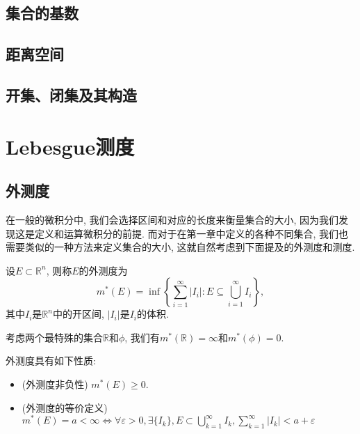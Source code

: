 \documentclass[theorem=false,mathfont=none,openany,sub3section]{easybook}
\newcommand{\btocgroup}[1][toc]{\addtocontents{#1}{\string\begingroup}}
\newcommand{\etocgroup}[1][toc]{\addtocontents{#1}{\string\endgroup}}
\begin{document}
\newpage

\section{集合的基数}

\newpage

\section{距离空间}

\newpage

\section{开集、闭集及其构造}

\newpage




\btocgroup
{}
\chapter{Lebesgue测度}

\etocgroup

\section{外测度}

在一般的微积分中, 我们会选择区间和对应的长度来衡量集合的大小, 因为我们发现这是定义和运算微积分的前提. 而对于在第一章中定义的各种不同集合, 我们也需要类似的一种方法来定义集合的大小, 这就自然考虑到下面提及的外测度和测度.\par

\begin{definition}
  设$E\subset \mathbb{R}^n$, 则称$E$的外测度为
  \begin{equation*}
    m^{*}(E)=\inf\left\{\sum_{i=1}^{\infty}|I_i|: E\subseteq \bigcup_{i=1}^{\infty}I_i\right\},
  \end{equation*}
  其中$I_i$是$\mathbb{R}^n$中的开区间, $|I_i|$是$I_i$的体积.\par
\end{definition}

\begin{example}
  考虑两个最特殊的集合$\mathbb{R}$和$\phi$, 我们有$m^{*}(\mathbb{R})=\infty$和$m^{*}(\phi)=0$.\par
\end{example}

\begin{proposition}
  外测度具有如下性质:\par
  \begin{itemize}
    \item (外测度非负性) $m^{*}(E)\geqslant 0$.
    \item (外测度的等价定义) $m^{*}(E)=a<\infty \Leftrightarrow \forall \varepsilon >0, \exists \{I_k\}, E\subset \bigcup_{k=1}^{\infty}I_k, \sum_{k=1}^{\infty}|I_k|<a+\varepsilon$
  \end{itemize}
\end{proposition}
\end{document}
